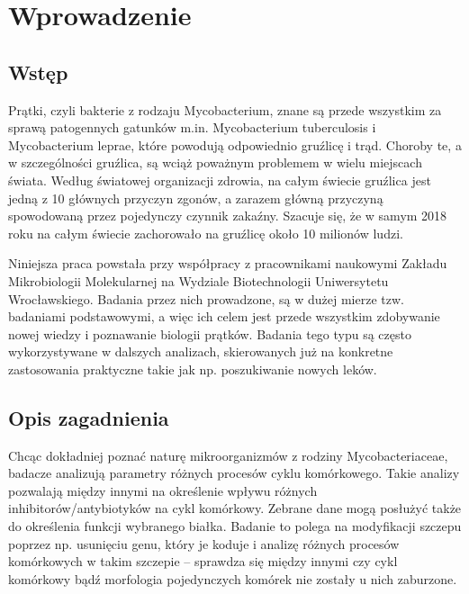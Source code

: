 \documentclass[declaration,shortabstract,mgr]{iithesis}
\author         {Artur Rosa}
\begin{document}

\chapter{Wprowadzenie}



\section{Wstęp}


Prątki, czyli bakterie z rodzaju Mycobacterium, znane są przede wszystkim za sprawą patogennych gatunków m.in. Mycobacterium tuberculosis i Mycobacterium leprae, które powodują odpowiednio gruźlicę i trąd. Choroby te, a w szczególności gruźlica, są wciąż poważnym problemem w wielu miejscach świata. Według światowej organizacji zdrowia, na całym świecie gruźlica jest jedną z 10 głównych przyczyn zgonów, a zarazem główną przyczyną spowodowaną przez pojedynczy czynnik zakaźny\cite{who-stats}. Szacuje się, że w samym 2018 roku na całym świecie zachorowało na gruźlicę około 10 milionów ludzi.

Niniejsza praca powstała przy współpracy z pracownikami naukowymi Zakładu Mikrobiologii Molekularnej na Wydziale Biotechnologii Uniwersytetu Wrocławskiego. Badania przez nich prowadzone, są w dużej mierze tzw. badaniami podstawowymi, a więc ich celem jest przede wszystkim zdobywanie nowej wiedzy i poznawanie biologii prątków. Badania tego typu są często wykorzystywane w dalszych analizach, skierowanych już na konkretne zastosowania praktyczne takie jak np. poszukiwanie nowych leków.


\section{Opis zagadnienia}
\label{sec:intro-description}

Chcąc dokładniej poznać naturę mikroorganizmów z rodziny Mycobacteriaceae, badacze analizują parametry różnych procesów cyklu komórkowego.
Takie analizy pozwalają między innymi na określenie wpływu różnych inhibitorów/antybiotyków na cykl komórkowy\cite{paper:watching-dna-replication}.
Zebrane dane mogą posłużyć także do określenia funkcji wybranego białka\cite{paper:protein-responsibility}.
Badanie to polega na modyfikacji szczepu poprzez np. usunięciu genu, który je koduje i analizę różnych procesów komórkowych w takim szczepie -- sprawdza się między innymi czy cykl komórkowy bądź morfologia pojedynczych komórek nie zostały u nich zaburzone.
\end{document}
